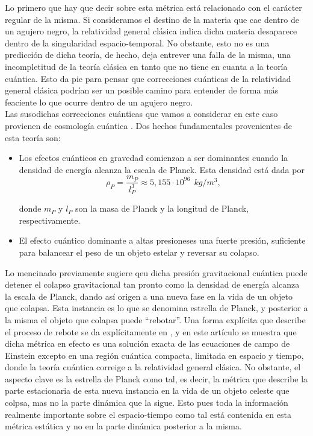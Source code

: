 \documentclass[16pt,a4paper]{article}
\numberwithin{equation}{section}
\theoremstyle{definition}
\begin{document}
Lo primero que hay que decir sobre esta métrica está relacionado con el carácter regular de la misma. Si consideramos el destino de la materia que cae dentro de un agujero negro, la relatividad general clásica indica dicha materia desaparece dentro de la singularidad espacio-temporal. No obstante, esto no es una predicción de dicha teoría, de hecho, deja entrever una falla de la misma, una incompletitud de la teoría clásica en tanto que no tiene en cuanta a la teoría cuántica. Esto da pie para pensar que correcciones cuánticas de la relatividad general clásica podrían ser un posible camino para entender de forma más feaciente lo que ocurre dentro de un agujero negro.\\

Las susodichas correcciones cuánticas que vamos a considerar en este caso provienen de cosmología cuántica \cite{rovelli}. Dos hechos fundamentales provenientes de esta teoría son:
\begin{itemize}
	\item Los efectos cuánticos en gravedad comienzan a ser dominantes cuando la densidad de energía alcanza la escala de Planck. Esta densidad está dada por 
	\begin{equation*}
	\rho_P = \frac{m_P}{l_P^3} \approx 5,155 \cdot 10^{96}\ \ kg/m^3,
	\end{equation*}
	
	donde $m_P$ y $l_P$ son la masa de Planck y la longitud de Planck, respectivamente.
	\item El efecto cuántico dominante a altas presioneses una fuerte presión, suficiente para balancear el peso de un objeto estelar y reversar su colapso.
\end{itemize}

Lo mencinado previamente sugiere qeu dicha presión gravitacional cuántica puede detener el colapso gravitacional tan pronto como la densidad de energía alcanza la escala de Planck, dando así origen a una nueva fase en la vida de un objeto que colapsa. Esta instancia es lo que se denomina estrella de Planck, y posterior a la misma el objeto que colapsa puede ``rebotar''. Una forma explícita que describe el proceso de rebote se da explícitamente en \cite{rovelliquantum}, y en este artículo se muestra que dicha métrica en efecto es una solución exacta de las ecuaciones de campo de Einstein excepto en una región cuántica compacta, limitada en espacio y tiempo, donde la teoría cuántica correige a la relatividad general clásica. No obstante, el aspecto clave es la estrella de Planck como tal, es decir, la métrica que describe la parte estacionaria de esta nueva instancia en la vida de un objeto celeste que colpsa, mas no la parte dinámica que la sigue. Esto pues toda la información realmente importante sobre el espacio-tiempo como tal está contenida en esta métrica estática y no en la parte dinámica posterior a la misma.\\
\end{document}
